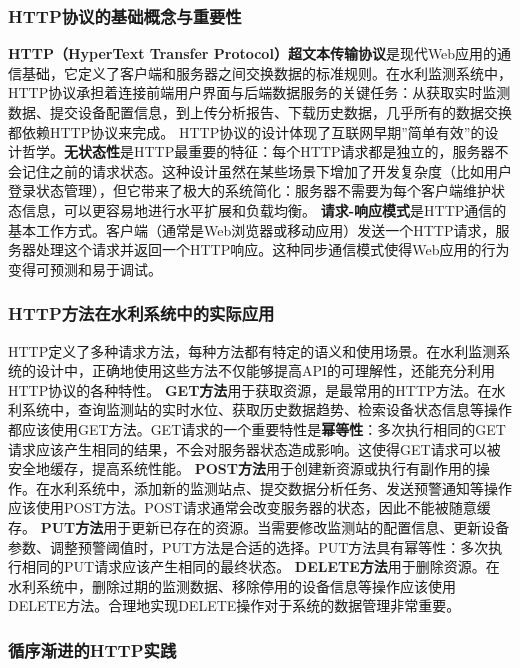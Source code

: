 \subsubsection{HTTP协议的基础概念与重要性}\label{httpux534fux8baeux7684ux57faux7840ux6982ux5ff5ux4e0eux91cdux8981ux6027}
\textbf{HTTP（HyperText Transfer
Protocol）超文本传输协议}是现代Web应用的通信基础，它定义了客户端和服务器之间交换数据的标准规则。在水利监测系统中，HTTP协议承担着连接前端用户界面与后端数据服务的关键任务：从获取实时监测数据、提交设备配置信息，到上传分析报告、下载历史数据，几乎所有的数据交换都依赖HTTP协议来完成。
HTTP协议的设计体现了互联网早期''简单有效''的设计哲学。\textbf{无状态性}是HTTP最重要的特征：每个HTTP请求都是独立的，服务器不会记住之前的请求状态。这种设计虽然在某些场景下增加了开发复杂度（比如用户登录状态管理），但它带来了极大的系统简化：服务器不需要为每个客户端维护状态信息，可以更容易地进行水平扩展和负载均衡。
\textbf{请求-响应模式}是HTTP通信的基本工作方式。客户端（通常是Web浏览器或移动应用）发送一个HTTP请求，服务器处理这个请求并返回一个HTTP响应。这种同步通信模式使得Web应用的行为变得可预测和易于调试。
\subsubsection{HTTP方法在水利系统中的实际应用}\label{httpux65b9ux6cd5ux5728ux6c34ux5229ux7cfbux7edfux4e2dux7684ux5b9eux9645ux5e94ux7528}
HTTP定义了多种请求方法，每种方法都有特定的语义和使用场景。在水利监测系统的设计中，正确地使用这些方法不仅能够提高API的可理解性，还能充分利用HTTP协议的各种特性。
\textbf{GET方法}用于获取资源，是最常用的HTTP方法。在水利系统中，查询监测站的实时水位、获取历史数据趋势、检索设备状态信息等操作都应该使用GET方法。GET请求的一个重要特性是\textbf{幂等性}：多次执行相同的GET请求应该产生相同的结果，不会对服务器状态造成影响。这使得GET请求可以被安全地缓存，提高系统性能。
\textbf{POST方法}用于创建新资源或执行有副作用的操作。在水利系统中，添加新的监测站点、提交数据分析任务、发送预警通知等操作应该使用POST方法。POST请求通常会改变服务器的状态，因此不能被随意缓存。
\textbf{PUT方法}用于更新已存在的资源。当需要修改监测站的配置信息、更新设备参数、调整预警阈值时，PUT方法是合适的选择。PUT方法具有幂等性：多次执行相同的PUT请求应该产生相同的最终状态。
\textbf{DELETE方法}用于删除资源。在水利系统中，删除过期的监测数据、移除停用的设备信息等操作应该使用DELETE方法。合理地实现DELETE操作对于系统的数据管理非常重要。
\subsubsection{循序渐进的HTTP实践}\label{ux5faaux5e8fux6e10ux8fdbux7684httpux5b9eux8df5}

